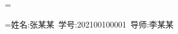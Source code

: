 \documentclass{sduthesis}
\begin{document}
\START
\ASSERT{\GetAuthor}{***}
\ASSERT{\GetStudentId}{***}
\ASSERT{\GetSupervisor}{***}

=\hbox{}
\ifdim\wd0=0pt \TYPE{personal-row-hidden=YES}\else\TYPE{personal-row-hidden=NO}\fi

=\hbox{姓名:张某某 学号:202100100001 导师:李某某}
\ifdim\wd1=0pt \TYPE{raw-row-nonempty=NO}\else\TYPE{raw-row-nonempty=YES}\fi


\makecoverpage
\END
\end{document}
